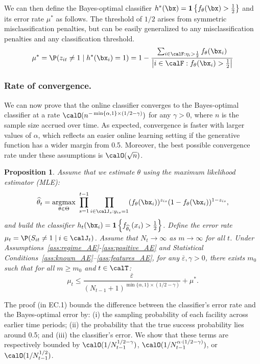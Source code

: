 \documentclass[11pt]{article}
\DeclareMathOperator*{\argmax}{argmax}
\newtheorem{proposition}{Proposition}[]
\begin{document}
We can then define the Bayes-optimal classifier $h^*(\bx)=\mathbf{1}\left\{f_\theta(\bx)>\frac{1}{2}\right\}$ and its error rate $\mu^*$ as follows.  The threshold of $1/2$ arises from symmetric misclassification penalties, but can be easily generalized to any misclassification penalties and any classification threshold.
$$\mu^*=\P(z_{it}\neq1 \mid h^*(\bx_i)=1)=1-\frac{\sum_{i\in\calF:\eta_{i}>\frac{1}{2}}f_\theta(\bx_{i})}{\left|i\in\calF:f_\theta(\bx_{i})>\frac{1}{2}\right|}$$

\subsubsection*{Rate of convergence.}
We can now prove that the online classifier converges to the Bayes-optimal classifier at a rate $\calO(n^{-\min\{\alpha,1\}\times (1/2-\gamma)})$ for any $\gamma>0$, where $n$ is the sample size accrued over time. As expected, convergence is faster with larger values of $\alpha$, which reflects an easier online learning setting if the generative function has a wider margin from 0.5. Moreover, the best possible convergence rate under these assumptions is $\calO(\sqrt n)$.
\setcounter{proposition}{0}
\begin{proposition}\label{prop:MLE_AE}
       Assume that we estimate $\theta$ using the maximum likelihood estimator (MLE):
    \begin{equation}
        \widehat{\theta}_t= \argmax_{\theta\in\Theta} \ \prod_{s=1}^{t-1} \prod_{i\in\calJ_s:y_{is}=1} (f_\theta(\bx_{i}))^{z_{is}}(1-f_\theta(\bx_{i}))^{1-z_{is}}, \label{eq:mle_estimation_AE}
    \end{equation}
    and build the classifier
    $h_t(\bx_{i}) = \mathbf{1}\left\{f_{\widehat{\theta}_t}(x_{i})>\frac{1}{2}\right\}$. Define the error rate $\mu_t = \P(S_{it}\neq 1 \mid i\in\calJ_t)$. Assume that $N_t \to \infty$ as $m \to \infty$ for all $t$. Under Assumptions~\ref{ass:regime_AE}-\ref{ass:positive_AE} and Statistical Conditions~\ref{ass:known_AE}--\ref{ass:features_AE}, for any $\overline\varepsilon,\gamma>0$, there exists $m_0$ such that for all $m\geq m_0$ and $t\in\calT$:
    \[\mu_t \leq \frac{\overline\varepsilon}{(N_{t-1}+1)^{\min\{\alpha,1\}\times (1/2-\gamma)}}+\mu^*.\]
\end{proposition}

The proof (in EC.1) bounds the difference between the classifier's error rate and the Bayes-optimal error by: (i) the sampling probability of each facility across earlier time periods; (ii) the probability that the true success probability lies around 0.5; and (iii) the classifier's error. We show that these terms are respectively bounded by $\calO(1/N_{t-1}^{1/2-\gamma})$, $\calO(1/N_{t-1}^{\alpha\cdot(1/2-\gamma)})$, or $\calO(1/N_{t-1}^{1/2})$.
\end{document}
